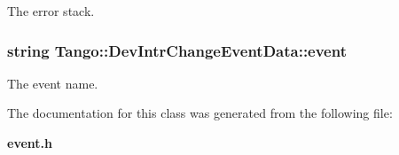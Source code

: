 The error stack. 

\subsubsection[{event}]{\setlength{\rightskip}{0pt plus 5cm}string Tango\-::\-Dev\-Intr\-Change\-Event\-Data\-::event}\label{classTango_1_1DevIntrChangeEventData_a9d4af2556b9cda47da2210546419f3ca}


The event name. 



The documentation for this class was generated from the following file\-:\begin{DoxyCompactItemize}
\item 
{\bf event.\-h}\end{DoxyCompactItemize}
